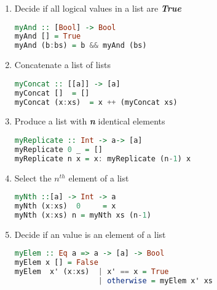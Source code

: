 \documentclass{article}
\begin{document}
\begin{Answer}
\begin{enumerate}
	\item Decide if all logical values in a list are \textbf{\textit{True}}
	\begin{lstlisting}[language=Haskell]
myAnd :: [Bool] -> Bool
myAnd [] = True
myAnd (b:bs) = b && myAnd (bs)
	\end{lstlisting}
	\item Concatenate a list of lists
\begin{lstlisting}[language=Haskell]
myConcat :: [[a]] -> [a] 
myConcat []  = []
myConcat (x:xs)  = x ++ (myConcat xs)
\end{lstlisting}
	\item Produce a list with \textbf{\textit{n}} identical elements
\begin{lstlisting}[language=Haskell]
myReplicate :: Int -> a-> [a]
myReplicate 0 _ = []
myReplicate n x = x: myReplicate (n-1) x
\end{lstlisting}
	\item Select the $n^{th}$ element of a list
\begin{lstlisting}[language=Haskell]
myNth ::[a] -> Int -> a
myNth (x:xs)  0     = x
myNth (x:xs) n = myNth xs (n-1)
\end{lstlisting}
	\item Decide if an value is an element of a list
\begin{lstlisting}[language=Haskell]
myElem :: Eq a => a -> [a] -> Bool
myElem x [] = False
myElem  x' (x:xs)  | x' == x = True
                   | otherwise = myElem x' xs
\end{lstlisting}
 \end{enumerate}
 \end{Answer}
 
\end{document}
